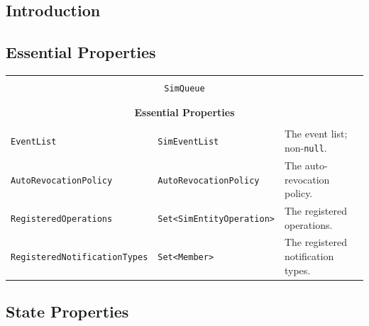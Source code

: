 \documentclass[12pt]{book}
\begin{document}
\subsection{Introduction}

\subsection{Essential Properties}

\begin{tabular}{|l|l|l|}
\hline
\multicolumn{3}{|c|}{} \\
\multicolumn{3}{|c|}{\lstinline[basicstyle=\large]{SimQueue}} \\
\multicolumn{3}{|c|}{} \\
\hline
\multicolumn{3}{|c|}{} \\
\multicolumn{3}{|c|}{\bf Essential Properties} \\
\multicolumn{3}{|c|}{} \\
\hline
\lstinline|EventList| & \lstinline|SimEventList| & The event list; non-\lstinline|null|. \\
\hline
\lstinline|AutoRevocationPolicy| & \lstinline|AutoRevocationPolicy| & The auto-revocation policy. \\
\hline
\lstinline|RegisteredOperations| & \lstinline|Set<SimEntityOperation>| & The registered operations. \\
\hline
\lstinline|RegisteredNotificationTypes| & \lstinline|Set<Member>| & The registered notification types. \\
\hline
\end{tabular}

\subsection{State Properties}
\end{document}
